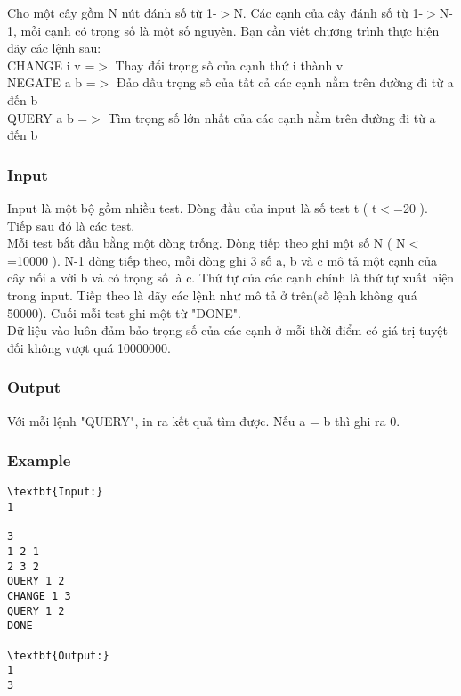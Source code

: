 



   Cho một cây gồm N nút đánh số từ 1-$>$N. Các cạnh của cây đánh số từ 1-$>$N-1, mỗi cạnh có trọng số là một số nguyên. Bạn cần viết chương trình thực hiện dãy các lệnh sau:   
\\   CHANGE i v =$>$ Thay đổi trọng số của cạnh thứ i thành v   
\\   NEGATE a b =$>$ Đảo dấu trọng số của tất cả các cạnh nằm trên đường đi từ a đến b   
\\   QUERY a b =$>$ Tìm trọng số lớn nhất của các cạnh nằm trên đường đi từ a đến b  

\subsubsection{   Input  }

   Input là một bộ gồm nhiều test. Dòng đầu của input là số test t ( t$<$=20 ). Tiếp sau đó là các test.   
\\   Mỗi test bắt đầu bằng một dòng trống. Dòng tiếp theo ghi một số N ( N$<$=10000 ). N-1 dòng tiếp theo, mỗi dòng ghi 3 số a, b và c mô tả một cạnh của cây nối a với b và có trọng số là c. Thứ tự của các cạnh chính là thứ tự xuất hiện trong input. Tiếp theo là dãy các lệnh như mô tả ở trên(số lệnh không quá 50000). Cuối mỗi test ghi một từ "DONE".   
\\   Dữ liệu vào luôn đảm bảo trọng số của các cạnh ở mỗi thời điểm có giá trị tuyệt đối không vượt quá 10000000.  

\subsubsection{   Output  }

   Với mỗi lệnh "QUERY", in ra kết quả tìm được. Nếu a = b  thì ghi ra 0.  

\subsubsection{   Example  }
\begin{verbatim}
\textbf{Input:}
1

3
1 2 1
2 3 2
QUERY 1 2
CHANGE 1 3
QUERY 1 2
DONE

\textbf{Output:}
1
3
\end{verbatim}